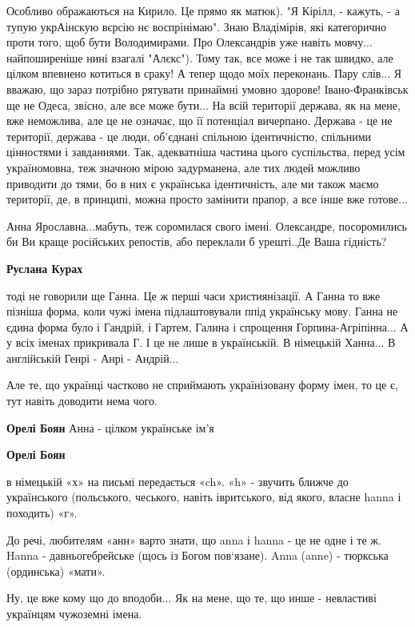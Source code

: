 \begin{itemize}
\begin{itemize}
Особливо ображаються на Кирило. Це прямо як матюк). "Я Кірілл, - кажуть, - а
тупую укрАінскую вєрсію нє воспрінімаю". Знаю Владімірів, які категорично проти
того, щоб бути Володимирами. Про Олександрів уже навіть мовчу... найпоширеніше
нині взагалі "Алєкс"). Тому так, все може і не так швидко, але цілком впевнено
котиться в сраку! А тепер щодо моїх переконань. Пару слів... Я вважаю, що зараз
потрібно рятувати принаймні умовно здорове! Івано-Франківськ ще не Одеса,
звісно, але все може бути... На всій території держава, як на мене, вже
неможлива, але це не означає, що її потенціал вичерпано. Держава - це не
території, держава - це люди, об'єднані спільною ідентичністю, спільними
цінностями і завданнями. Так, адекватніша частина цього суспільства, перед усім
україномовна, теж значною мірою задурманена, але тих людей можливо приводити до
тями, бо в них є українська ідентичність, але ми також маємо території, де, в
принципі, можна просто замінити прапор, а все інше вже готове...

Анна Ярославна...мабуть, теж соромилася свого імені. Олександре, посоромились
би Ви краще російських репостів, або переклали б урешті..Де Ваша гідність?

\textbf{Руслана Курах} 

тоді не говорили ще Ганна. Це ж перші часи християнізації. А Ганна то вже
пізніша форма, коли чужі імена підлаштовували ппід українську мову. Ганна не
єдина форма було і Гандрій, і Гартем, Галина і спрощення Горпина-Агріпінна... А
у всіх іменах прикривала Г. І це не лише в українській. В німецькій Ханна... В
англійській Генрі - Анрі - Андрій...

Але те, що українці частково не сприймають українізовану форму імен, то це є,
тут навіть доводити нема чого.

\textbf{Орелі Боян} Анна - цілком українське ім'я

\textbf{Орелі Боян} 

в німецькій «х» на письмі передається «ch». «h» - звучить ближче до
українського (польського, чеського, навіть івритського, від якого, власне hanna
і походить) «г».

До речі, любителям «анн» варто знати, що anna і hanna - це не одне і те ж.
Hanna - давньогебрейське (щось із Богом пов‘язане). Anna (anne) - тюркська
(ординська) «мати».

Ну, це вже кому що до вподоби... Як на мене, що те, що инше - невластиві
українцям чужоземні імена.


\end{itemize}
\end{itemize}
